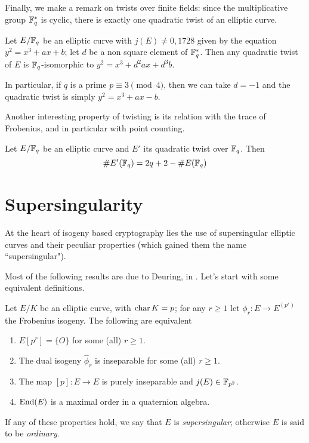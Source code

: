 Finally, we make a remark on twists over finite fields: since the multiplicative group $\mathbb{F}_q^\ast$ is cyclic, there is exactly one quadratic twist of an elliptic curve.
\begin{proposition}
    Let $E/\mathbb{F}_q$ be an elliptic curve with $j(E)\neq0,1728$ given by the equation $y^2=x^3+ax+b$; let $d$ be a non square element of $\mathbb{F}_q^\ast$. Then any quadratic twist of $E$ is $\mathbb{F}_q$-isomorphic to $y^2=x^3+d^2ax+d^3b$.
\end{proposition}
In particular, if $q$ is a prime $p\equiv3\pmod4$, then we can take $d=-1$ and the quadratic twist is simply $y^2=x^3+ax-b$.

Another interesting property of twisting is its relation with the trace of Frobenius, and in particular with point counting.
\begin{proposition}
    Let $E/\mathbb{F}_q$ be an elliptic curve and $E'$ its quadratic twist over $\mathbb{F}_q$. Then $$\# E'(\mathbb{F}_q) = 2q+2 - \# E(\mathbb{F}_q)$$
\end{proposition}

\section{Supersingularity}

At the heart of isogeny based cryptography lies the use of supersingular elliptic curves and their peculiar properties (which gained them the name ``supersingular").

Most of the following results are due to Deuring, in \cite{Deuring1941}. Let's start with some equivalent definitions.
\begin{theorem}
    Let $E/K$ be an elliptic curve, with $\operatorname{char} K=p$; for any $r\ge1$ let $\phi_r:E\to E^{(p^r)}$ the Frobenius isogeny. The following are equivalent
    \begin{enumerate}
        \item $E[p^r]=\{O\}$ for some (all) $r\ge1$.
        \item The dual isogeny $\hat\phi_r$ is inseparable for some (all) $r\ge1$.
        \item The map $[p]:E\to E$ is purely inseparable and $j(E)\in\mathbb{F}_{p^2}$.
        \item $\operatorname{End}(E)$ is a maximal order in a quaternion algebra.
    \end{enumerate}
    If any of these properties hold, we say that $E$ is \emph{supersingular}; otherwise $E$ is said to be \emph{ordinary}.
\end{theorem}

